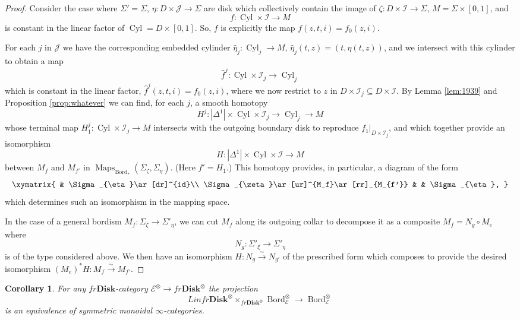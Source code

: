 \documentclass[reqno]{amsart}
\newtheorem{corollary}[lemma]{Corollary}
\theoremstyle{definition}
\newcommand{\mcl}[1]{\mathcal{#1}}
\newcommand{\msc}[1]{\mathscr{#1}}
\newcommand{\opn}[1]{\operatorname{#1}}
\newcommand{\ot}{\otimes}
\newcommand{\Disk}{\mathbf{Disk}}
\DeclareMathOperator{\Maps}{Maps}
\DeclareMathOperator{\Bord}{Bord}
\renewcommand{\1}{\mathbf{1}}
\renewcommand{\hat}{\widehat}
\begin{document}
\begin{proof}
Consider the case where $\Sigma'=\Sigma$, $\eta:D\times \mcl{J}\to \Sigma$ are disk which collectively contain the image of $\zeta:D\times \mcl{I}\to \Sigma$, $M=\Sigma\times [0,1]$, and
\[
f:\opn{Cyl}\times \mcl{I}\to M
\]
is constant in the linear factor of $\opn{Cyl}=D\times[0,1]$.  So, $f$ is explicitly the map $f(z,t,i)=f_0(z,i)$.
\par

For each $j$ in $\mcl{J}$ we have the corresponding embedded cylinder $\hat{\eta}_j:\opn{Cyl}_j\to M$, $\hat{\eta}_j(t,z)=(t,\eta(t,z))$, and we intersect with this cylinder to obtain a map
\[
\hat{f}^j:\opn{Cyl}\times \mcl{I}_j\to \opn{Cyl}_j
\]
which is constant in the linear factor, $\hat{f}^j(z,t,i)=f_0(z,i)$, where we now restrict to $z$ in $D\times \mcl{I}_j\subseteq D\times\mcl{I}$.  By Lemma \ref{lem:1939} and Proposition \ref{prop:whatever} we can find, for each $j$, a smooth homotopy
\[
H^j:|\Delta^1|\times \opn{Cyl}\times\mcl{I}_j\to \opn{Cyl}_j\to M
\]
whose terminal map $H^j_1:\opn{Cyl}\times \mcl{I}_j\to M$ intersects with the outgoing boundary disk to reproduce $f_1|_{D\times \mcl{I}_j}$, and which together provide an isomorphism
\[
H:|\Delta^1|\times \opn{Cyl}\times\mcl{I}\to M
\]
between $M_f$ and $M_{f'}$ in $\Maps_{\Bord_{\ast}}(\Sigma_{\zeta},\Sigma_{\eta})$.  (Here $f'=H_1$.)  This homotopy provides, in particular, a diagram of the form
\[
\xymatrix{
 & \Sigma_{\eta}\ar[dr]^{id}\\
\Sigma_{\zeta}\ar[ur]^{M_f}\ar[rr]_{M_{f'}} & & \Sigma_{\eta},
}
\]
which determines such an isomorphism in the mapping space.
\par

In the case of a general bordism $M_f:\Sigma_{\zeta}\to \Sigma'_{\eta}$, we can cut $M_f$ along its outgoing collar to decompose it as a composite $M_f=N_g\circ M_e$ where
\[
N_g:\Sigma'_{\xi}\to \Sigma'_{\eta}
\]
is of the type considered above.  We then have an isomorphism $H:N_g\overset{\sim}\to N_{g'}$ of the prescribed form which composes to provide the desired isomorphism $(M_e)^{\ast}H:M_f\overset{\sim}\to M_{f'}$.
\end{proof}


\begin{corollary}\label{cor:whatever}
For any $fr\Disk$-category $\msc{E}^{\ot}\to fr\Disk^{\ot}$ the projection
\[
Linfr\Disk^{\ot}\times_{fr\Disk^{\ot}}\Bord_{\msc{E}}^{\ot}\to \Bord_{\msc{E}}^{\ot}
\]
is an equivalence of symmetric monoidal $\infty$-categories.
\end{corollary}
\end{document}
